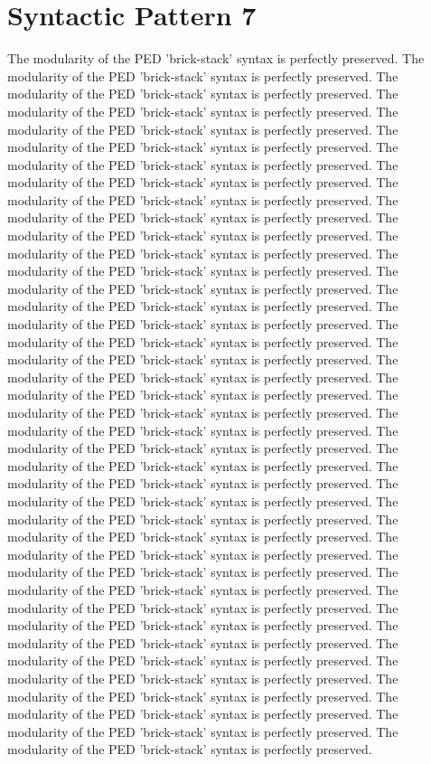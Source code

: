 \section{Syntactic Pattern 7}
The modularity of the PED 'brick-stack' syntax is perfectly preserved. The modularity of the PED 'brick-stack' syntax is perfectly preserved. The modularity of the PED 'brick-stack' syntax is perfectly preserved. The modularity of the PED 'brick-stack' syntax is perfectly preserved. The modularity of the PED 'brick-stack' syntax is perfectly preserved. The modularity of the PED 'brick-stack' syntax is perfectly preserved. The modularity of the PED 'brick-stack' syntax is perfectly preserved. The modularity of the PED 'brick-stack' syntax is perfectly preserved. The modularity of the PED 'brick-stack' syntax is perfectly preserved. The modularity of the PED 'brick-stack' syntax is perfectly preserved. The modularity of the PED 'brick-stack' syntax is perfectly preserved. The modularity of the PED 'brick-stack' syntax is perfectly preserved. The modularity of the PED 'brick-stack' syntax is perfectly preserved. The modularity of the PED 'brick-stack' syntax is perfectly preserved. The modularity of the PED 'brick-stack' syntax is perfectly preserved. The modularity of the PED 'brick-stack' syntax is perfectly preserved. The modularity of the PED 'brick-stack' syntax is perfectly preserved. The modularity of the PED 'brick-stack' syntax is perfectly preserved. The modularity of the PED 'brick-stack' syntax is perfectly preserved. The modularity of the PED 'brick-stack' syntax is perfectly preserved. The modularity of the PED 'brick-stack' syntax is perfectly preserved. The modularity of the PED 'brick-stack' syntax is perfectly preserved. The modularity of the PED 'brick-stack' syntax is perfectly preserved. The modularity of the PED 'brick-stack' syntax is perfectly preserved. The modularity of the PED 'brick-stack' syntax is perfectly preserved. The modularity of the PED 'brick-stack' syntax is perfectly preserved. The modularity of the PED 'brick-stack' syntax is perfectly preserved. The modularity of the PED 'brick-stack' syntax is perfectly preserved. The modularity of the PED 'brick-stack' syntax is perfectly preserved. The modularity of the PED 'brick-stack' syntax is perfectly preserved. The modularity of the PED 'brick-stack' syntax is perfectly preserved. The modularity of the PED 'brick-stack' syntax is perfectly preserved. The modularity of the PED 'brick-stack' syntax is perfectly preserved. The modularity of the PED 'brick-stack' syntax is perfectly preserved. The modularity of the PED 'brick-stack' syntax is perfectly preserved. The modularity of the PED 'brick-stack' syntax is perfectly preserved. The modularity of the PED 'brick-stack' syntax is perfectly preserved. The modularity of the PED 'brick-stack' syntax is perfectly preserved. The modularity of the PED 'brick-stack' syntax is perfectly preserved. The modularity of the PED 'brick-stack' syntax is perfectly preserved. 

